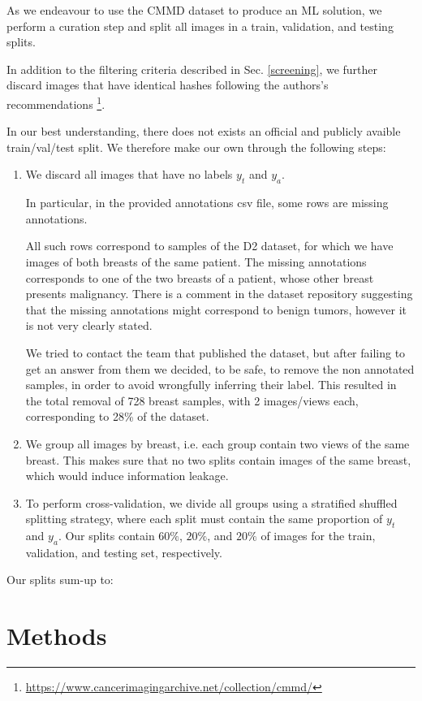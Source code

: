 \documentclass[11pt]{article}
\begin{document}
As we endeavour to use the CMMD dataset to produce an ML solution, we
perform a curation step and split all images in a train, validation, and testing splits.

In addition to the filtering criteria described in Sec. \ref{screening}, we further
discard images that have identical hashes following the authors's recommendations \footnote{\url{https://www.cancerimagingarchive.net/collection/cmmd/}}.

In our best understanding, there does not exists an official and publicly avaible train/val/test
split. We therefore make our own through the following steps:

\begin{enumerate}
\item We discard all images that have no labels \(y_t\) and \(y_a\).

In particular, in the provided annotations csv file, some rows are missing annotations.

All such rows correspond to samples of the D2 dataset, for which we have images of both
breasts of the same patient.
The missing annotations corresponds to one of the two breasts of a patient, whose other
breast presents malignancy.
There is a comment in the dataset repository suggesting that the missing annotations
might correspond to benign tumors, however it is not very clearly stated.

We tried to contact the team that published the dataset, but after failing to get an answer
from them we decided, to be safe, to remove the non annotated samples, in
order to avoid wrongfully inferring their label. This resulted in the total removal of
728 breast samples, with 2 images/views each, corresponding to  28\% of the dataset.

\item We group all images by breast, i.e. each group contain two views of the same breast.
This makes sure that no two splits contain images of the same breast, which would
induce information leakage.
\item To perform cross-validation, we divide all groups using a stratified
shuffled splitting strategy, where each split
must contain the same proportion of \(y_t\) and \(y_a\). Our splits contain \(60\%\),
 \(20\%\), and \(20\%\) of images for the train, validation, and testing set, respectively.
\end{enumerate}

Our splits sum-up to:
\section{Methods}
\label{sec:orgdc9fb14}
\end{document}
